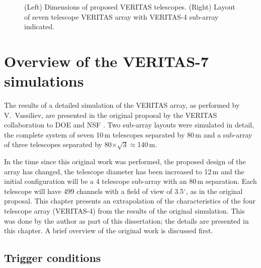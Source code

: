 \begin{figure}[t]
\begin{minipage}[c][0.27\textheight][c]{\textwidth}
\hspace*{\fill}
\end{minipage}
\caption{\label{FIG::VERITAS::PHYSICAL} (Left) Dimensions of proposed 
VERITAS telescopes. (Right) Layout of seven telescope VERITAS array with 
\mbox{VERITAS-4} sub-array indicated.}
\end{figure}

\section{Overview of the VERITAS-7 simulations}
\label{SEC::VERITAS::V7SIMULATIONS}

\enlargethispage{14pt}
The results of a detailed simulation of the VERITAS array, as
performed by V.~Vassiliev, are presented in the original proposal by
the VERITAS collaboration to DOE and NSF
\citep{REF::VERITAS::1999PROPOSAL}. Two sub-array layouts were
simulated in detail, the complete system of seven 10\,m telescopes
separated by 80\,m and a sub-array of three telescopes separated by
80$\times\sqrt{3}\approx$140\,m.

In the time since this original work was performed, the proposed
design of the array has changed, the telescope diameter has been
increased to 12\,m and the initial configuration will be a 4 telescope
sub-array with an 80\,m separation. Each telescope will have 499
channels with a field of view of 3.5$^\circ$, as in the original
proposal. This chapter presents an extrapolation of the
characteristics of the four telescope array (VERITAS-4) from the
results of the original simulation. This was done by the author as
part of this dissertation; the details are presented in this
chapter. A brief overview of the original work is discussed first.

\subsection{Trigger conditions}
\label{SEC::VERITAS::V7TRIGGER}

